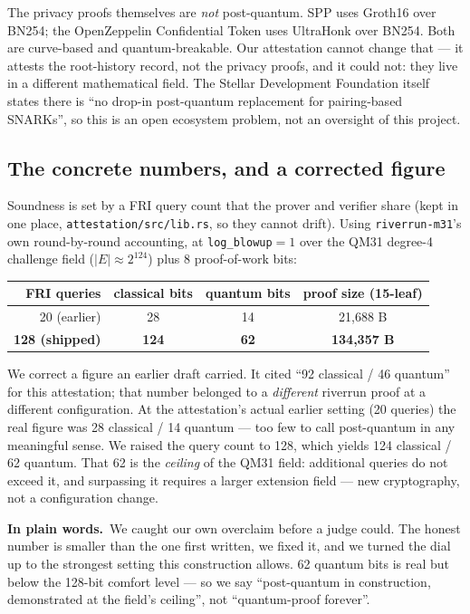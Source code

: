 \documentclass[11pt]{article}
\newcommand{\intuition}[1]{%
  \par\vspace{0.5em}%
  \noindent\colorbox{soft}{\parbox{\dimexpr\linewidth-2\fboxsep}{%
  \small\textbf{\color{klein}In plain words.}\ #1}}%
  \par\vspace{0.5em}%
}
\newcommand{\code}[1]{\texttt{\small #1}}
\begin{document}
The privacy proofs themselves are \emph{not} post-quantum. SPP uses Groth16 over
BN254; the OpenZeppelin Confidential Token uses UltraHonk over BN254. Both are
curve-based and quantum-breakable. Our attestation cannot change that --- it
attests the root-history record, not the privacy proofs, and it could not: they
live in a different mathematical field. The Stellar Development Foundation itself
states there is ``no drop-in post-quantum replacement for pairing-based SNARKs'',
so this is an open ecosystem problem, not an oversight of this project.

\subsection{The concrete numbers, and a corrected figure}

Soundness is set by a FRI query count that the prover and verifier share (kept in
one place, \code{attestation/src/lib.rs}, so they cannot drift). Using
\code{riverrun-m31}'s own round-by-round accounting, at \code{log\_blowup}$=1$
over the QM31 degree-4 challenge field ($|E|\approx 2^{124}$) plus 8
proof-of-work bits:

\begin{center}
\begin{tabular}{rccc}
\toprule
FRI queries & classical bits & quantum bits & proof size (15-leaf) \\
\midrule
20 (earlier) & 28 & 14 & 21{,}688 B \\
\textbf{128 (shipped)} & \textbf{124} & \textbf{62} & \textbf{134{,}357 B} \\
\bottomrule
\end{tabular}
\end{center}

We correct a figure an earlier draft carried. It cited ``92 classical / 46
quantum'' for this attestation; that number belonged to a \emph{different}
riverrun proof at a different configuration. At the attestation's actual earlier
setting (20 queries) the real figure was 28 classical / 14 quantum --- too few to
call post-quantum in any meaningful sense. We raised the query count to 128,
which yields 124 classical / 62 quantum. That 62 is the \emph{ceiling} of the
QM31 field: additional queries do not exceed it, and surpassing it requires a
larger extension field --- new cryptography, not a configuration change.

\intuition{We caught our own overclaim before a judge could. The honest number is
smaller than the one first written, we fixed it, and we turned the dial up to the
strongest setting this construction allows. 62 quantum bits is real but below the
128-bit comfort level --- so we say ``post-quantum in construction, demonstrated
at the field's ceiling'', not ``quantum-proof forever''.}
\end{document}
